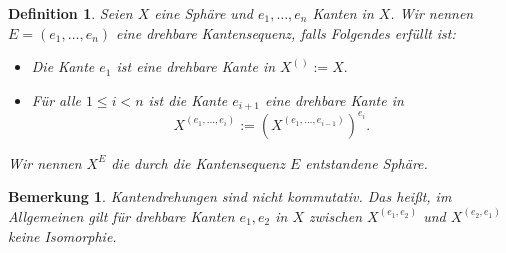 \documentclass[12pt,titlepage,twoside,cleardoublepage]{article}
\theoremstyle{nummermitklammern}
\newtheorem{definition}[temp]{Definition}
\newtheorem{bemerkung}[temp]{Bemerkung}
\newtheorem{definition}[zahl]{Definition}
\newtheorem{bemerkung}[zahl]{Bemerkung}
\numberwithin{equation}{section}
\begin{document}
\begin{definition}
Seien $X$ eine Sphäre und $e_1,\ldots,e_n$ Kanten in $X$. Wir nennen $E=(e_1,\ldots,e_n)$ eine \emph{drehbare Kantensequenz}, falls Folgendes erfüllt ist: 
\begin{itemize}
\item Die Kante $e_1$ ist eine drehbare Kante in $X^{()}:=X.$ 
\item Für alle $1\leq i < n$ ist die Kante $e_{i+1}$ eine drehbare Kante in 
\[
X^{(e_1,\ldots,e_i)}:=(X^{(e_1,\ldots,e_{i-1})})^{e_i}.
\] 
\end{itemize}
Wir nennen $X^E$ die durch die Kantensequenz $E$ entstandene Sphäre. 
\end{definition}

\begin{bemerkung}
Kantendrehungen sind nicht kommutativ. Das heißt, im Allgemeinen gilt für drehbare Kanten $e_1,e_2$ in $X$ zwischen $X^{(e_1,e_2)}$ und $X^{(e_2,e_1)}$ keine Isomorphie. 

\end{bemerkung}
\end{document}
